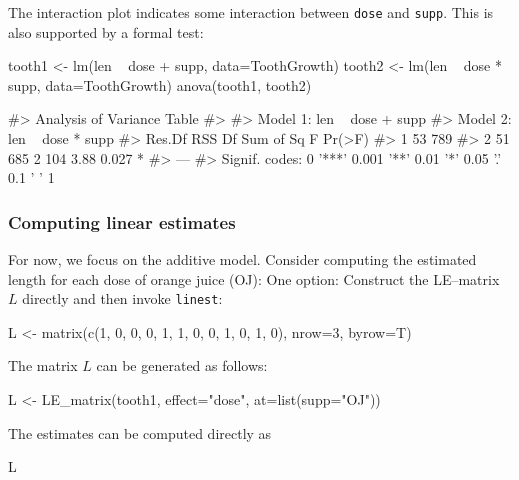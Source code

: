 The interaction plot indicates some interaction between \texttt{dose}
and \texttt{supp}. This is also supported by a formal test:

\begin{Schunk}
\begin{Sinput}
tooth1 <- lm(len ~ dose + supp, data=ToothGrowth)
tooth2 <- lm(len ~ dose * supp, data=ToothGrowth)
anova(tooth1, tooth2)
\end{Sinput}
\begin{Soutput}
#> Analysis of Variance Table
#> 
#> Model 1: len ~ dose + supp
#> Model 2: len ~ dose * supp
#>   Res.Df RSS Df Sum of Sq    F Pr(>F)  
#> 1     53 789                           
#> 2     51 685  2       104 3.88  0.027 *
#> ---
#> Signif. codes:  0 '***' 0.001 '**' 0.01 '*' 0.05 '.' 0.1 ' ' 1
\end{Soutput}
\end{Schunk}

\hypertarget{computing-linear-estimates}{%
\subsubsection{Computing linear
estimates}\label{computing-linear-estimates}}

For now, we focus on the additive model. Consider computing the
estimated length for each dose of orange juice (OJ): One option:
Construct the LE--matrix \(L\) directly and then invoke \texttt{linest}:

\begin{Schunk}
\begin{Sinput}
L <- matrix(c(1, 0, 0, 0, 
              1, 1, 0, 0,
              1, 0, 1, 0), nrow=3, byrow=T)
\end{Sinput}
\end{Schunk}

The matrix \(L\) can be generated as follows:

\begin{Schunk}
\begin{Sinput}
L <- LE_matrix(tooth1, effect="dose", at=list(supp="OJ"))
\end{Sinput}
\end{Schunk}

The estimates can be computed directly as

\begin{Schunk}
\begin{Sinput}
L %*% coef(tooth1)
\end{Sinput}
\end{Schunk}

